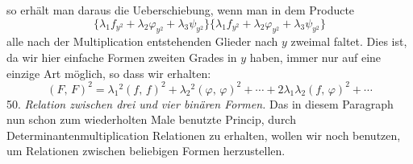 
so erhält man daraus die Ueberschiebung, wenn man in dem Producte
\[
\{\lambda_1 f_{y^2} + \lambda_2 \varphi_{y^2} + \lambda_3 \psi_{y^2}\}\{\lambda_1 f_{y^2} + \lambda_2 \varphi_{y^2} + \lambda_3 \psi_{y^2}\}
\]
alle nach der Multiplication entstehenden Glieder nach $y$ zweimal faltet. Dies ist, da wir hier einfache Formen zweiten Grades in $y$ haben, immer nur auf eine einzige Art möglich, so dass wir erhalten:
\[
(F,\,F)^2 = \lambda_1{}^2(f,\,f)^2 + \lambda_2{}^2(\varphi,\,\varphi)^2 + \cdots + 2\lambda_1\lambda_2(f,\,\varphi)^2 + \cdots
\]
50. \textit{Relation zwischen drei und vier binären Formen.} Das in diesem Paragraph nun schon zum wiederholten Male benutzte Princip, durch Determinantenmultiplication Relationen zu erhalten, wollen wir noch benutzen, um Relationen zwischen beliebigen Formen herzustellen.

